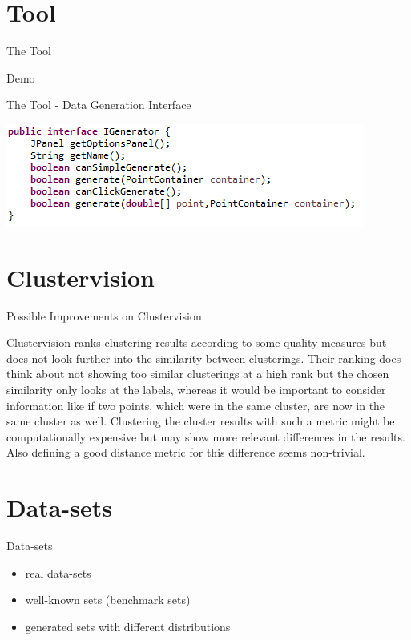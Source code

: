 \documentclass{beamer}
\begin{document}
\section{Tool}

\begin{frame}{The Tool}

\centerline{Demo}

\end{frame}

\begin{frame}{The Tool - Data Generation Interface}

\includegraphics[width=\textwidth]{interface}

\end{frame}

\section{Clustervision}

\begin{frame}{Possible Improvements on Clustervision}

Clustervision ranks clustering results according to some quality measures but does not look further into the similarity between clusterings. Their ranking does think about not showing too similar clusterings at a high rank but the chosen similarity only looks at the labels, whereas it would be important to consider information like if two points, which were in the same cluster, are now in the same cluster as well. Clustering the cluster results with such a metric might be computationally expensive but may show more relevant differences in the results. Also defining a good distance metric for this difference seems non-trivial.

\end{frame}

\section{Data-sets}

\begin{frame}{Data-sets}
\begin{itemize}
\item real data-sets\cite{realdata}
\item well-known sets (benchmark sets)\cite{wellknown}
\item generated sets with different distributions

\end{itemize}
\end{frame}
\end{document}
